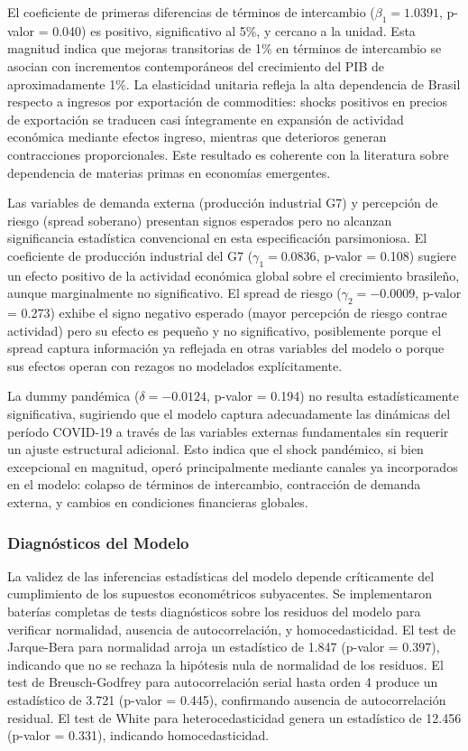 \documentclass[3p,11pt,draft,natbib=false]{elsarticle}
\begin{document}
El coeficiente de primeras diferencias de términos de intercambio ($\beta_1 = 1.0391$, p-valor = 0.040) es positivo, significativo al 5\%, y cercano a la unidad. Esta magnitud indica que mejoras transitorias de 1\% en términos de intercambio se asocian con incrementos contemporáneos del crecimiento del PIB de aproximadamente 1\%. La elasticidad unitaria refleja la alta dependencia de Brasil respecto a ingresos por exportación de commodities: shocks positivos en precios de exportación se traducen casi íntegramente en expansión de actividad económica mediante efectos ingreso, mientras que deterioros generan contracciones proporcionales. Este resultado es coherente con la literatura sobre dependencia de materias primas en economías emergentes.

Las variables de demanda externa (producción industrial G7) y percepción de riesgo (spread soberano) presentan signos esperados pero no alcanzan significancia estadística convencional en esta especificación parsimoniosa. El coeficiente de producción industrial del G7 ($\gamma_1 = 0.0836$, p-valor = 0.108) sugiere un efecto positivo de la actividad económica global sobre el crecimiento brasileño, aunque marginalmente no significativo. El spread de riesgo ($\gamma_2 = -0.0009$, p-valor = 0.273) exhibe el signo negativo esperado (mayor percepción de riesgo contrae actividad) pero su efecto es pequeño y no significativo, posiblemente porque el spread captura información ya reflejada en otras variables del modelo o porque sus efectos operan con rezagos no modelados explícitamente.

La dummy pandémica ($\delta = -0.0124$, p-valor = 0.194) no resulta estadísticamente significativa, sugiriendo que el modelo captura adecuadamente las dinámicas del período COVID-19 a través de las variables externas fundamentales sin requerir un ajuste estructural adicional. Esto indica que el shock pandémico, si bien excepcional en magnitud, operó principalmente mediante canales ya incorporados en el modelo: colapso de términos de intercambio, contracción de demanda externa, y cambios en condiciones financieras globales.

\subsubsection{Diagnósticos del Modelo}

La validez de las inferencias estadísticas del modelo depende críticamente del cumplimiento de los supuestos econométricos subyacentes. Se implementaron baterías completas de tests diagnósticos sobre los residuos del modelo para verificar normalidad, ausencia de autocorrelación, y homocedasticidad. El test de Jarque-Bera para normalidad arroja un estadístico de 1.847 (p-valor = 0.397), indicando que no se rechaza la hipótesis nula de normalidad de los residuos. El test de Breusch-Godfrey para autocorrelación serial hasta orden 4 produce un estadístico de 3.721 (p-valor = 0.445), confirmando ausencia de autocorrelación residual. El test de White para heterocedasticidad genera un estadístico de 12.456 (p-valor = 0.331), indicando homocedasticidad.
\end{document}
